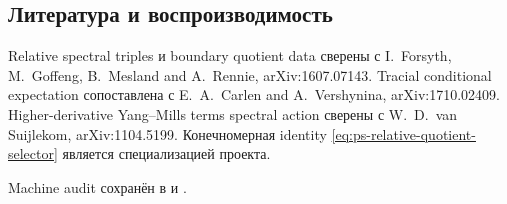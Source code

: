 \subsection{Литература и воспроизводимость}

Relative spectral triples и boundary quotient data сверены с I.~Forsyth,
M.~Goffeng, B.~Mesland and A.~Rennie, arXiv:1607.07143. Tracial conditional
expectation сопоставлена с E.~A.~Carlen and A.~Vershynina,
arXiv:1710.02409. Higher-derivative Yang--Mills terms spectral action
сверены с W.~D.~van Suijlekom, arXiv:1104.5199. Конечномерная identity
\eqref{eq:ps-relative-quotient-selector} является специализацией проекта.

Machine audit сохранён в
 и
.